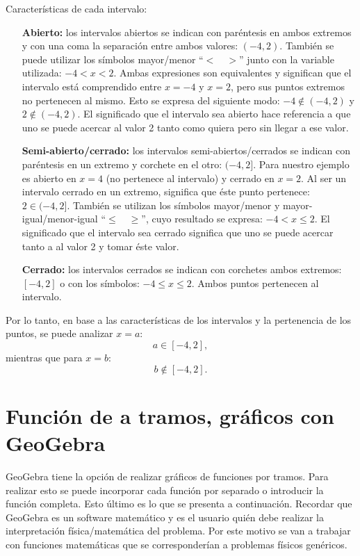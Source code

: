 Características de cada intervalo:
\begin{enumerate}
  \item[\bf Abierto:] los intervalos abiertos se indican con paréntesis en ambos
    extremos y con una coma la separación entre ambos valores: $(-4,2)$. También
    se puede utilizar los símbolos mayor/menor ``$< \quad >$'' junto con la
    variable utilizada: $-4 < x < 2$. Ambas expresiones son equivalentes y
    significan que el intervalo está comprendido entre $x=-4$ y $x=2$, pero sus
    puntos extremos no pertenecen al mismo. Esto se expresa del siguiente modo:
    $-4\notin (-4,2)$ y $2\notin (-4,2)$. El significado que el intervalo sea
    abierto hace referencia a que uno se puede acercar al valor 2 tanto como
    quiera pero sin llegar a ese valor.
  \item[\bf Semi-abierto/cerrado:] los intervalos semi-abiertos/cerrados se
    indican con paréntesis en un extremo y corchete en el otro: $(-4,2]$. Para
    nuestro ejemplo es abierto en $x=4$ (no pertenece al intervalo) y cerrado en
    $x=2$. Al ser un intervalo cerrado en un extremo, significa que éste punto
    pertenece: $2 \in (-4,2]$. También se utilizan los símbolos mayor/menor y
    mayor-igual/menor-igual ``$\le \quad \ge$'', cuyo resultado se expresa:
    \mbox{$-4<x\le2$}. El significado que el intervalo sea cerrado significa que
    uno se puede acercar tanto a al valor 2 y tomar éste valor.
  \item[\bf Cerrado:] los intervalos cerrados se indican con corchetes ambos
    extremos: $[-4,2]$ o con los símbolos: $-4\le x \le 2$. Ambos puntos
    pertenecen al intervalo.
\end{enumerate}

Por lo tanto, en base a las características de los intervalos y la pertenencia
de los puntos, se puede analizar $x=a$:
$$
a \in [-4,2],
$$
mientras que para $x=b$:
$$
b \notin [-4,2].
$$

\section{Función de a tramos, gráficos con GeoGebra}
\label{c.geogebra}

GeoGebra tiene la opción de realizar gráficos de funciones por tramos. Para
realizar esto se puede incorporar cada función por separado o introducir la
función completa. Esto último es lo que se presenta a continuación. Recordar que
GeoGebra es un software matemático y es el usuario quién debe realizar la
interpretación física/matemática del problema. Por este motivo se van a trabajar
con funciones matemáticas que se corresponderían a problemas físicos genéricos.

